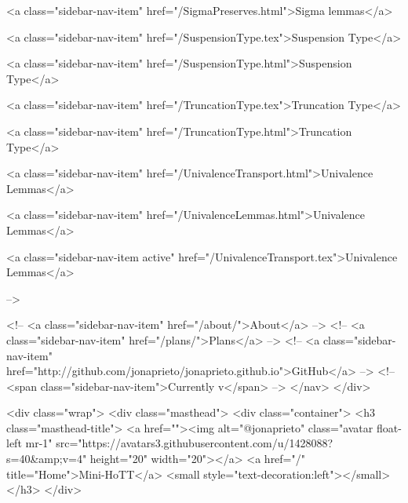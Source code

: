       
    
      
        
          <a class="sidebar-nav-item" href="/SigmaPreserves.html">Sigma lemmas</a>
        
      
    
      
        
          <a class="sidebar-nav-item" href="/SuspensionType.tex">Suspension Type</a>
        
      
    
      
        
          <a class="sidebar-nav-item" href="/SuspensionType.html">Suspension Type</a>
        
      
    
      
        
          <a class="sidebar-nav-item" href="/TruncationType.tex">Truncation Type</a>
        
      
    
      
        
          <a class="sidebar-nav-item" href="/TruncationType.html">Truncation Type</a>
        
      
    
      
        
          <a class="sidebar-nav-item" href="/UnivalenceTransport.html">Univalence Lemmas</a>
        
      
    
      
        
          <a class="sidebar-nav-item" href="/UnivalenceLemmas.html">Univalence Lemmas</a>
        
      
    
      
        
          <a class="sidebar-nav-item active" href="/UnivalenceTransport.tex">Univalence Lemmas</a>
        
      
     -->

    <!-- <a class="sidebar-nav-item" href="/about/">About</a> -->
    <!-- <a class="sidebar-nav-item" href="/plans/">Plans</a> -->
    <!-- <a class="sidebar-nav-item" href="http://github.com/jonaprieto/jonaprieto.github.io">GitHub</a> -->
    <!-- <span class="sidebar-nav-item">Currently v</span> -->
  </nav>
</div>

    <div class="wrap">
      <div class="masthead">
        <div class="container">
          <h3 class="masthead-title">
            <a href=""><img alt="@jonaprieto" class="avatar float-left mr-1" src="https://avatars3.githubusercontent.com/u/1428088?s=40&amp;v=4" height="20" width="20"></a>
            <a href="/" title="Home">Mini-HoTT</a>
            <small style="text-decoration:left"></small>
          </h3>
        </div>
      
